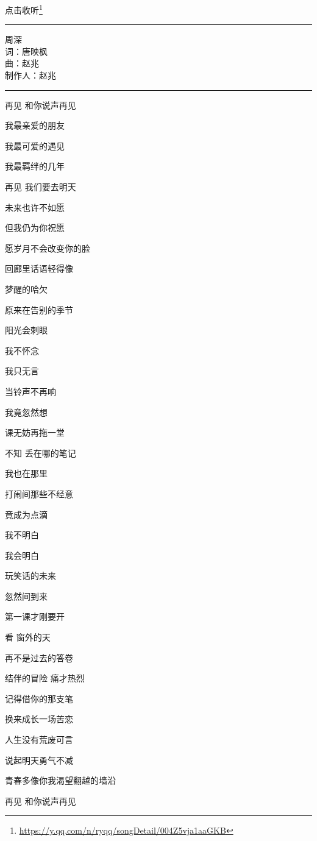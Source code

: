 \documentclass[]{ctexbook}
\renewcommand{\href}[2]{#2\footnote{\url{#1}}}
\begin{document}
\href{https://y.qq.com/n/ryqq/songDetail/004Z5vja1aaGKB}{点击收听}

\begin{center}\rule{0.5\linewidth}{0.5pt}\end{center}

周深\\
词：唐映枫\\
曲：赵兆\\
制作人：赵兆

\begin{center}\rule{0.5\linewidth}{0.5pt}\end{center}

再见 和你说声再见

我最亲爱的朋友

我最可爱的遇见

我最羁绊的几年

再见 我们要去明天

未来也许不如愿

但我仍为你祝愿

愿岁月不会改变你的脸

回廊里话语轻得像

梦醒的哈欠

原来在告别的季节

阳光会刺眼

我不怀念

我只无言

当铃声不再响

我竟忽然想

课无妨再拖一堂

不知 丢在哪的笔记

我也在那里

打闹间那些不经意

竟成为点滴

我不明白

我会明白

玩笑话的未来

忽然间到来

第一课才刚要开

看 窗外的天

再不是过去的答卷

结伴的冒险 痛才热烈

记得借你的那支笔

换来成长一场苦恋

人生没有荒废可言

说起明天勇气不减

青春多像你我渴望翻越的墙沿

再见 和你说声再见
\end{document}
